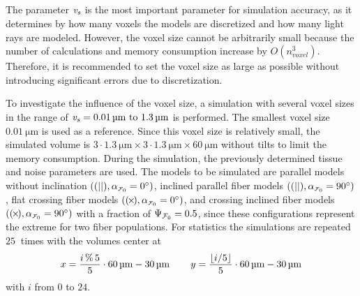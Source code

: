 \subsection{\Voxelsize{} \texorpdfstring{\voxelsize{}}{}}
%
The parameter \Voxelsize{} $\textnormal{$\mathit{v_{s}}$}$ is the most important parameter for simulation accuracy, as it determines by how many voxels the models are discretized and how many light rays are modeled.
However, the voxel size cannot be arbitrarily small because the number of calculations and memory consumption increase by $O(n_{\mathit{voxel}}^3)$.
Therefore, it is recommended to set the voxel size as large as possible without introducing significant errors due to discretization.
\par
%
To investigate the influence of the voxel size, a simulation with several voxel sizes in the range of $\voxelsize = \SIrange{0.01}{1.3}{\micro\meter}$ is performed.
The smallest voxel size $\SI{0.01}{\micro\meter}$ is used as a reference.
Since this voxel size is relatively small, the simulated volume is $3 \cdot \SI{1.3}{\micro\meter} \times 3 \cdot \SI{1.3}{\micro\meter} \times \SI{60}{\micro\meter}$ without tilts to limit the memory consumption.
During the simulation, the previously determined tissue and noise parameters are used.
The models to be simulated are parallel models without inclination $\left( \pfbs, \modelInc = \SI{0}{\degree} \right)$, inclined parallel fiber models $\left( \pfbs, \modelInc = \SI{90}{\degree} \right)$, flat crossing fiber models $\left( \cfbs, \modelInc = \SI{0}{\degree} \right)$, and crossing inclined fiber models $\left( \cfbs, \modelInc = \SI{90}{\degree} \right)$ with a fraction of $\textnormal{$\Psi_{\textnormal{$\mathcal{F}_0$}}$} = \SI{0.5}{}$, since these configurations represent the extreme for two fiber populations.
For statistics the simulations are repeated $\SI{25}{}$ times with the volumes center at
\begin{align}
    x=\frac{i\,\%\,5}{5} \cdot \SI{60}{\micro\meter} - \SI{30}{\micro\meter} \hspace{5ex}
    y=\frac{\lfloor i/5\rfloor}{5} \cdot \SI{60}{\micro\meter} - \SI{30}{\micro\meter}
\end{align}
with $i$ from $0$ to $24$.
%
%
%

